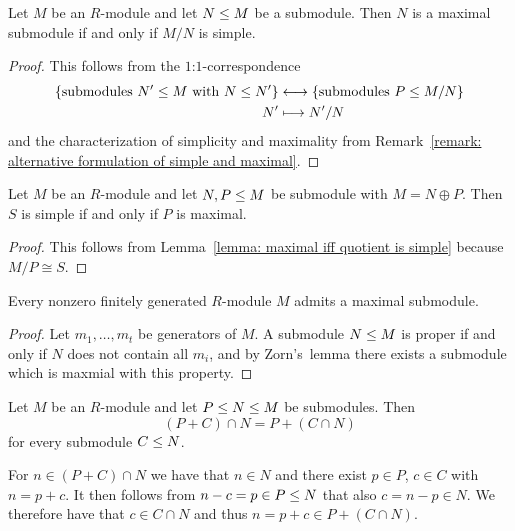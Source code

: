 \begin{lemma}
  \label{lemma: maximal iff quotient is simple}
  Let $M$ be an $R$-module and let $N \leq M$ be a submodule.
  Then $N$ is a maximal submodule if and only if $M/N$ is simple.
\end{lemma}


\begin{proof}
  This follows from the $1$:$1$-correspondence
  \begin{align*}
    \{ \text{submodules $N' \leq M$ with $N \leq N'$} \}
    &\longleftrightarrow
    \{ \text{submodules $P \leq M/N$} \}
    \\
                  N'
    &\longmapsto  N'/N
  \end{align*}
  and the characterization of simplicity and maximality from Remark~\ref{remark: alternative formulation of simple and maximal}.
\end{proof}


\begin{corollary}
  Let $M$ be an $R$-module and let $N, P \leq M$ be submodule with $M = N \oplus P$.
  Then $S$ is simple if and only if $P$ is maximal.
\end{corollary}


\begin{proof}
  This follows from Lemma~\ref{lemma: maximal iff quotient is simple} because $M/P \cong S$.
\end{proof}


\begin{lemma}
  \label{lemma: fg modules contain max submodules}
  Every nonzero finitely generated $R$-module $M$ admits a maximal submodule.
\end{lemma}


\begin{proof}
  Let $m_1, \dotsc, m_t$ be generators of $M$.
  A submodule $N \leq M$ is proper if and only if $N$ does not contain all $m_i$, and by Zorn’s~lemma there exists a submodule which is maxmial with this property.
\end{proof}


\begin{lemma}
  \label{lemma: modularity of submodule lattice}
  Let $M$ be an $R$-module and let $P \leq N \leq M$ be submodules.
  Then
  \[
      (P + C) \cap N
    = P + (C \cap N)
  \]
  for every submodule $C \leq N$.
  
  For $n \in (P + C) \cap N$ we have that $n \in N$ and there exist $p \in P$, $c \in C$ with $n = p + c$.
  It then follows from $n - c = p \in P \leq N$ that also $c = n - p \in N$.
  We therefore have that $c \in C \cap N$ and thus $n = p + c \in P + (C \cap N)$.
\end{lemma}


